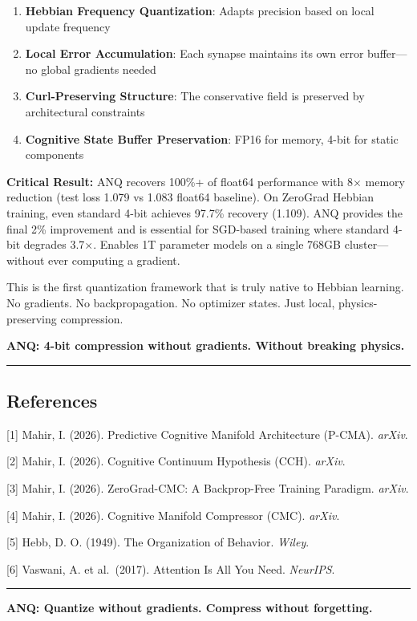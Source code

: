 \documentclass[
  11pt,
  a4paper,
]{article}
\providecommand{\tightlist}{%
  \setlength{\itemsep}{0pt}\setlength{\parskip}{0pt}}
\begin{document}
\begin{enumerate}
\def\labelenumi{\arabic{enumi}.}
\tightlist
\item
  \textbf{Hebbian Frequency Quantization}: Adapts precision based on
  local update frequency
\item
  \textbf{Local Error Accumulation}: Each synapse maintains its own
  error buffer---no global gradients needed
\item
  \textbf{Curl-Preserving Structure}: The conservative field is
  preserved by architectural constraints
\item
  \textbf{Cognitive State Buffer Preservation}: FP16 for memory, 4-bit
  for static components
\end{enumerate}

\textbf{Critical Result:} ANQ recovers 100\%+ of float64 performance
with 8× memory reduction (test loss 1.079 vs 1.083 float64 baseline). On
ZeroGrad Hebbian training, even standard 4-bit achieves 97.7\% recovery
(1.109). ANQ provides the final 2\% improvement and is essential for
SGD-based training where standard 4-bit degrades 3.7×. Enables 1T
parameter models on a single 768GB cluster---without ever computing a
gradient.

This is the first quantization framework that is truly native to Hebbian
learning. No gradients. No backpropagation. No optimizer states. Just
local, physics-preserving compression.

\textbf{ANQ: 4-bit compression without gradients. Without breaking
physics.}

\begin{center}\rule{0.5\linewidth}{0.5pt}\end{center}

\subsection{References}\label{references}

{[}1{]} Mahir, I. (2026). Predictive Cognitive Manifold Architecture
(P-CMA). \emph{arXiv}.

{[}2{]} Mahir, I. (2026). Cognitive Continuum Hypothesis (CCH).
\emph{arXiv}.

{[}3{]} Mahir, I. (2026). ZeroGrad-CMC: A Backprop-Free Training
Paradigm. \emph{arXiv}.

{[}4{]} Mahir, I. (2026). Cognitive Manifold Compressor (CMC).
\emph{arXiv}.

{[}5{]} Hebb, D. O. (1949). The Organization of Behavior. \emph{Wiley}.

{[}6{]} Vaswani, A. et al.~(2017). Attention Is All You Need.
\emph{NeurIPS}.

\begin{center}\rule{0.5\linewidth}{0.5pt}\end{center}

\textbf{ANQ: Quantize without gradients. Compress without forgetting.}
\end{document}
